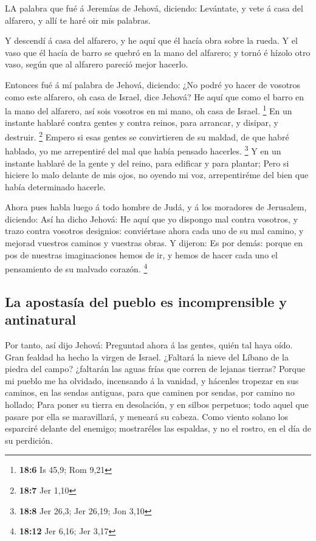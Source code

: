  LA palabra que fué á Jeremías de Jehová, diciendo:
 Levántate, y vete á casa del alfarero, y allí te haré oir
mis palabras.

 Y descendí á casa del alfarero, y he aquí que él hacía obra
sobre la rueda.  Y el vaso que él hacía de barro se quebró
en la mano del alfarero; y tornó é hízolo otro vaso, según que al
alfarero pareció mejor hacerlo.

 Entonces fué á mí palabra de Jehová, diciendo: 
¿No podré yo hacer de vosotros como este alfarero, oh casa de Israel,
dice Jehová? He aquí que como el barro en la mano del alfarero, así sois
vosotros en mi mano, oh casa de Israel. \footnote{\textbf{18:6} Is 45,9;
  Rom 9,21}  En un instante hablaré contra gentes y contra
reinos, para arrancar, y disipar, y destruir. \footnote{\textbf{18:7}
  Jer 1,10}  Empero si esas gentes se convirtieren de su
maldad, de que habré hablado, yo me arrepentiré del mal que había
pensado hacerles. \footnote{\textbf{18:8} Jer 26,3; Jer 26,19; Jon 3,10}
 Y en un instante hablaré de la gente y del reino, para
edificar y para plantar;  Pero si hiciere lo malo delante
de mis ojos, no oyendo mi voz, arrepentiréme del bien que había
determinado hacerle.

 Ahora pues habla luego á todo hombre de Judá, y á los
moradores de Jerusalem, diciendo: Así ha dicho Jehová: He aquí que yo
dispongo mal contra vosotros, y trazo contra vosotros designios:
conviértase ahora cada uno de su mal camino, y mejorad vuestros caminos
y vuestras obras.  Y dijeron: Es por demás: porque en pos
de nuestras imaginaciones hemos de ir, y hemos de hacer cada uno el
pensamiento de su malvado corazón. \footnote{\textbf{18:12} Jer 6,16;
  Jer 3,17}

\hypertarget{la-apostasuxeda-del-pueblo-es-incomprensible-y-antinatural}{%
\subsection{La apostasía del pueblo es incomprensible y
antinatural}\label{la-apostasuxeda-del-pueblo-es-incomprensible-y-antinatural}}

 Por tanto, así dijo Jehová: Preguntad ahora á las gentes,
quién tal haya oído. Gran fealdad ha hecho la virgen de Israel.
 ¿Faltará la nieve del Líbano de la piedra del campo?
¿faltarán las aguas frías que corren de lejanas tierras? 
Porque mi pueblo me ha olvidado, incensando á la vanidad, y hácenles
tropezar en sus caminos, en las sendas antiguas, para que caminen por
sendas, por camino no hollado;  Para poner su tierra en
desolación, y en silbos perpetuos; todo aquel que pasare por ella se
maravillará, y meneará su cabeza.  Como viento solano los
esparciré delante del enemigo; mostraréles las espaldas, y no el rostro,
en el día de su perdición.

